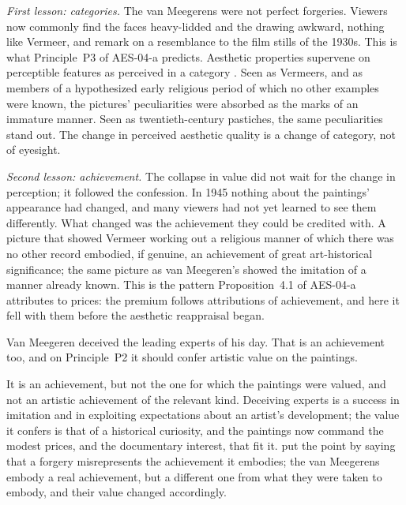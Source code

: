 \documentclass{situationist-preprint}
\begin{document}
\emph{First lesson: categories.} The van Meegerens were not perfect forgeries. Viewers now commonly find the faces heavy-lidded and the drawing awkward, nothing like Vermeer, and remark on a resemblance to the film stills of the 1930s. This is what Principle~P3 of AES-04-a predicts. Aesthetic properties supervene on perceptible features as perceived in a category \citep{Walton1970}. Seen as Vermeers, and as members of a hypothesized early religious period of which no other examples were known, the pictures' peculiarities were absorbed as the marks of an immature manner. Seen as twentieth-century pastiches, the same peculiarities stand out. The change in perceived aesthetic quality is a change of category, not of eyesight.

\emph{Second lesson: achievement.} The collapse in value did not wait for the change in perception; it followed the confession. In 1945 nothing about the paintings' appearance had changed, and many viewers had not yet learned to see them differently. What changed was the achievement they could be credited with. A picture that showed Vermeer working out a religious manner of which there was no other record embodied, if genuine, an achievement of great art-historical significance; the same picture as van Meegeren's showed the imitation of a manner already known. This is the pattern Proposition~4.1 of AES-04-a attributes to prices: the premium follows attributions of achievement, and here it fell with them before the aesthetic reappraisal began.

\begin{objection}
Van Meegeren deceived the leading experts of his day. That is an achievement too, and on Principle~P2 it should confer artistic value on the paintings.
\end{objection}

\begin{reply}
It is an achievement, but not the one for which the paintings were valued, and not an artistic achievement of the relevant kind. Deceiving experts is a success in imitation and in exploiting expectations about an artist's development; the value it confers is that of a historical curiosity, and the paintings now command the modest prices, and the documentary interest, that fit it. \citet{Dutton1979} put the point by saying that a forgery misrepresents the achievement it embodies; the van Meegerens embody a real achievement, but a different one from what they were taken to embody, and their value changed accordingly.
\end{reply}
\end{document}
